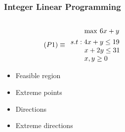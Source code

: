 \documentclass{beamer}
\begin{document}
    \begin{frame}
        \frametitle{Integer Linear Programming}
        
        \begin{columns}[T] %
        \begin{column}{.48\textwidth}
        \begin{equation*}
            (P1) \equiv 	\begin{array}{l}
	                        \qquad \max \hspace{2pt}  6x + y  \vspace{4pt} \\ 
	                        s.t: 4x + y \leq 19 \\
	                        \qquad x + 2y \leq 31 \\
	                        \qquad x,y\geq 0
	                        \end{array}
        \end{equation*}
        \begin{itemize}
            \item Feasible region
            \item Extreme points
            \item Directions
            \item Extreme directions
        \end{itemize}
        \end{column}%
        \hfill%
        \begin{column}{.48\textwidth}

\end{column}
\end{columns}
\end{frame}
\end{document}
